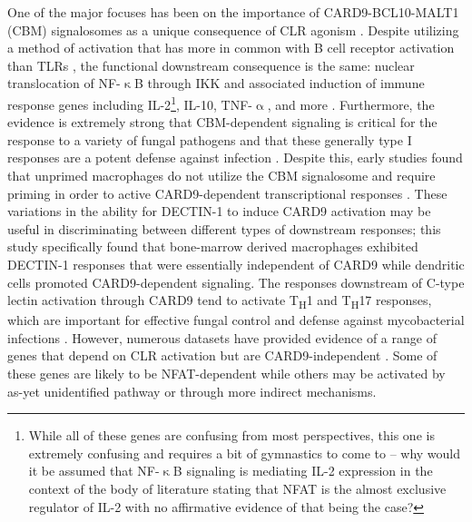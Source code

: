 One of the major focuses has been on the importance of CARD9\hyp{}BCL10\hyp{}MALT1 (CBM) signalosomes as a unique consequence of CLR agonism \citep{Drummond2011a, Drummond2016, Drummond2018, Marakalala2010, Marakalala2017}. Despite utilizing a method of activation that has more in common with B cell receptor activation than TLRs \citep{Monroe2006}, the functional downstream consequence is the same: nuclear translocation of NF\hyp{}$\upkappa$B through IKK and associated induction of immune response genes including IL\hyp{}2\footnote{While all of these genes are confusing from most perspectives, this one is extremely confusing and requires a bit of gymnastics to come to -- why would it be assumed that NF\hyp{}$\upkappa$B signaling is mediating IL\hyp{}2 expression in the context of the body of literature stating that NFAT is the almost exclusive regulator of IL\hyp{}2 with no affirmative evidence of that being the case?}, IL\hyp{}10, TNF\hyp{}$\upalpha$, and more \citep{Sancho2012}. Furthermore, the evidence is extremely strong that CBM\hyp{}dependent signaling is critical for the response to a variety of fungal pathogens and that these generally type I responses are a potent defense against infection \citep{Drummond2018, Hardison2012, Willment2008}. Despite this, early studies found that unprimed macrophages do not utilize the CBM signalosome and require priming in order to active CARD9\hyp{}dependent transcriptional responses \citep{Goodridge2009}. These variations in the ability for DECTIN\hyp{}1 to induce CARD9 activation may be useful in discriminating between different types of downstream responses; this study specifically found that bone\hyp{}marrow derived macrophages exhibited DECTIN\hyp{}1 responses that were essentially independent of CARD9 while dendritic cells promoted CARD9\hyp{}dependent signaling. The responses downstream of C\hyp{}type lectin activation through CARD9 tend to activate T\textsubscript{H}1 and T\textsubscript{H}17 responses, which are important for effective fungal control and defense against mycobacterial infections \citep{Drummond2011a, Lyadova2015, Zanoni2005, Zenaro2009}. However, numerous datasets have provided evidence of a range of genes that depend on CLR activation but are CARD9\hyp{}independent \citep{Deerhake2021}. Some of these genes are likely to be NFAT\hyp{}dependent while others may be activated by as\hyp{}yet unidentified pathway or through more indirect mechanisms.

